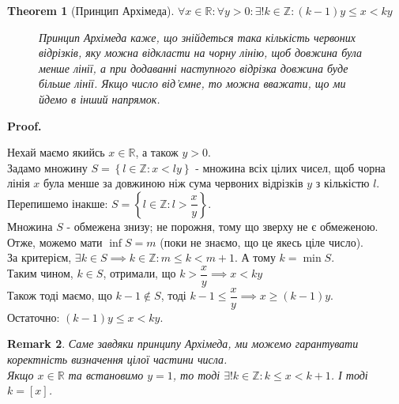 \documentclass[a4paper, 14pt]{article}
\makeatletter
\def\qed{$\blacksquare$}
\theoremstyle{theoremdd}
\newtheorem{theorem}{Theorem}[subsection]
\theoremstyle{theoremdd}
\theoremstyle{theoremdd}
\theoremstyle{theoremdd}
\theoremstyle{theoremdd}
\theoremstyle{theoremdd}
\newtheorem{remark}[theorem]{Remark}
\theoremstyle{theoremdd}
\theoremstyle{theoremdd}
\renewenvironment{proof}[1][Proof.\\]{\par
\pushQED{\hfill \qed}%
\normalfont \topsep6\p@\@plus6\p@\relax
\trivlist
\item\relax
{\bfseries
#1\@addpunct{.}}\hspace\labelsep\ignorespaces
}{%
\popQED\endtrivlist\@endpefalse
}
\makeatother
\begin{document}
	\begin{theorem}[Принцип Архімеда]
	$\forall x \in \mathbb{R}: \forall y > 0: \exists ! k \in \mathbb{Z}: (k-1)y \leq x < ky$
	\begin{figure}[H]
	\qquad
	\caption*{Принцип Архімеда каже, що знійдеться така кількість червоних відрізків, яку можна відкласти на чорну лінію, щоб довжина була менше лінії, а при додаванні наступного відрізка довжина буде більше лінії. Якщо число від'ємне, то можна вважати, що ми йдемо в інший напрямок.}
	\end{figure}
	\end{theorem}
	
	\begin{proof}
	Нехай маємо якийсь $x \in \mathbb{R}$, а також $y > 0$.\\
	Задамо множину $S = \left\{l \in \mathbb{Z} :  x < ly \right\}$ - множина всіх цілих чисел, щоб чорна лінія $x$ була менше за довжиною ніж сума червоних відрізків $y$ з кількістю $l$.\\
	Перепишемо інакше: $S = \left\{l \in \mathbb{Z} :  l > \dfrac{x}{y} \right\}$.\\
	Множина $S$ - обмежена знизу; не порожня, тому що зверху не є обмеженою. Отже, можемо мати $\inf S = m$ (поки не знаємо, що це якесь ціле число). \\
	За критерієм, $\exists k \in S \implies k \in \mathbb{Z}: m \leq k < m+1$. А тому $k = \min S$.\\
	Таким чином, $k \in S$, отримали, що $k > \dfrac{x}{y} \implies x < ky$\\
	Також тоді маємо, що $k-1 \not \in S$, тоді $k-1 \leq \dfrac{x}{y} \implies x \geq (k-1)y$.\\
	Остаточно: $(k-1)y \leq x < ky$.
	\end{proof}
	
	\begin{remark}
	Саме завдяки принципу Архімеда, ми можемо гарантувати коректність визначення цілої частини числа.\\
	Якщо $x \in \mathbb{R}$ та встановимо $y = 1$, то тоді $\exists !k \in \mathbb{Z}: k \leq x < k+1$. І тоді $k = [x]$.
	\end{remark}
	
\end{document}
